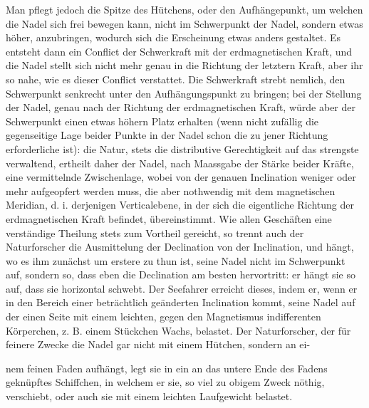 Man pflegt jedoch die Spitze des Hütchens, oder den Aufhängepunkt, um welchen die Nadel sich frei bewegen kann, nicht im Schwerpunkt der Nadel, sondern etwas höher, anzubringen, wodurch sich die Erscheinung etwas anders gestaltet. Es entsteht dann ein Conflict der Schwerkraft mit der erdmagnetischen Kraft, und die Nadel stellt sich nicht mehr genau in die Richtung der letztern Kraft, aber ihr so nahe, wie es dieser Conflict verstattet. Die Schwerkraft strebt nemlich, den Schwerpunkt senkrecht unter den Aufhängungspunkt zu bringen; bei der Stellung der Nadel, genau nach der Richtung der erdmagnetischen Kraft, würde aber der Schwerpunkt einen etwas höhern Platz erhalten (wenn nicht zufällig die gegenseitige Lage beider Punkte in der Nadel schon die zu jener Richtung erforderliche ist): die Natur, stets die distributive Gerechtigkeit auf das strengste verwaltend, ertheilt daher der Nadel, nach Maassgabe der Stärke beider Kräfte, eine vermittelnde Zwischenlage, wobei von der genauen Inclination weniger oder mehr aufgeopfert werden muss, die aber nothwendig mit dem magnetischen Meridian, d. i. derjenigen Verticalebene, in der sich die eigentliche Richtung der erdmagnetischen Kraft befindet, übereinstimmt. Wie allen Geschäften eine verständige Theilung stets zum Vortheil gereicht, so trennt auch der Naturforscher die Ausmittelung der Declination von der Inclination, und hängt, wo es ihm zunächst um erstere zu thun ist, seine Nadel nicht im Schwerpunkt auf, sondern so, dass eben die Declination am besten hervortritt: er hängt sie so auf, dass sie horizontal schwebt. Der Seefahrer erreicht dieses, indem er, wenn er in den Bereich einer beträchtlich geänderten Inclination kommt, seine Nadel auf der einen Seite mit einem leichten, gegen den Magnetismus indifferenten Körperchen, z. B. einem Stückchen Wachs, belastet. Der Naturforscher, der für feinere Zwecke die Nadel gar nicht mit einem Hütchen, sondern an ei-
\par\clearpage
{}
\noindent nem feinen Faden aufhängt, legt sie in ein an das untere Ende des Fadens geknüpftes Schiffchen, in welchem er sie, so viel zu obigem Zweck nöthig, verschiebt, oder auch sie mit einem leichten Laufgewicht belastet.

